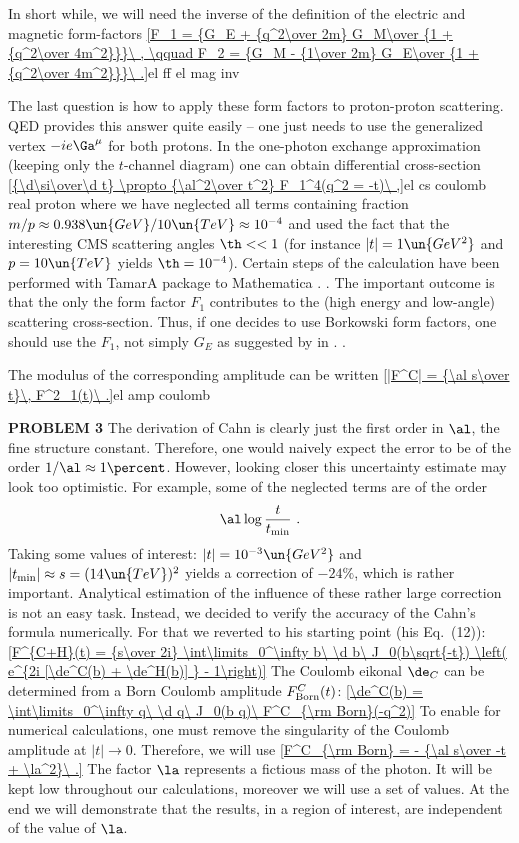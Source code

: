 In short while, we will need the inverse of the definition of the electric and magnetic form-factors
\eqref{F_1 = {G_E + {q^2\over 2m} G_M\over {1 + {q^2\over 4m^2}}}\ , \qquad F_2 = {G_M - {1\over 2m} G_E\over {1 + {q^2\over 4m^2}}}\ .}{el ff el mag inv}

The last question is how to apply these form factors to proton-proton scattering. QED provides this answer quite easily -- one just needs to use the generalized vertex $-ie\Ga^\mu$ for both protons. In the one-photon exchange approximation (keeping only the $t$-channel diagram) one can obtain differential cross-section
\eqref{{\d\si\over\d t} \propto {\al^2\over t^2} F_1^4(q^2 = -t)\ ,}{el cs coulomb real proton}
where we have neglected all terms containing fraction $m/p\approx 0.938\un{GeV}/10\un{TeV}\approx 10^{-4}$ and used the fact that the interesting CMS scattering angles $\th<<1$ (for instance $|t|=1\un{GeV^2}$ and $p=10\un{TeV}$ yields $\th=10^{-4}$). Certain steps of the calculation have been performed with TamarA package  to Mathematica . . The important outcome is that the only the form factor $F_1$ contributes to the (high energy and low-angle) scattering cross-section. Thus, if one decides to use Borkowski form factors, one should use the $F_1$, not simply $G_E$ as suggested by \KL{} in . .

The modulus of the corresponding amplitude can be written
\eqref{|F^C| = {\al s\over t}\, F^2_1(t)\ .}{el amp coulomb}

{\bf PROBLEM 3}
The derivation of Cahn  is clearly just the first order in $\al$, the fine structure constant. Therefore, one would naively expect the error to be of the order $1/\al\approx 1\percent$. However, looking closer this uncertainty estimate may look too optimistic. For example, some of the neglected terms are of the order
$$\al \log {t\over t_{\rm min}}\ .$$
Taking some values of interest: $|t| = 10^{-3}\un{GeV^2}$ and $|t_{\rm min}| \approx s = (14\un{TeV})^2$ yields a correction of $-24\percent$, which is rather important. Analytical estimation of the influence of these rather large correction is not an easy task. Instead, we decided to verify the accuracy of the Cahn's formula numerically. For that we reverted to his starting point (his Eq.~(12)):
\eqref{F^{C+H}(t) = {s\over 2i} \int\limits_0^\infty b\ \d b\ J_0(b\sqrt{-t}) \left( e^{2i [\de^C(b) + \de^H(b)] } - 1\right)}{}
The Coulomb eikonal $\de_C$ can be determined from a Born Coulomb amplitude $F^C_{\rm Born}(t)$:
\eqref{\de^C(b) = \int\limits_0^\infty q\ \d q\ J_0(b q)\ F^C_{\rm Born}(-q^2)}{}
To enable for numerical calculations, one must remove the singularity of the Coulomb amplitude at $|t|\to 0$. Therefore, we will use
\eqref{F^C_{\rm Born} = - {\al s\over -t + \la^2}\ .}{}
The factor $\la$ represents a fictious mass of the photon. It will be kept low throughout our calculations, moreover we will use a set of values. At the end we will demonstrate that the results, in a region of interest, are independent of the value of $\la$.

